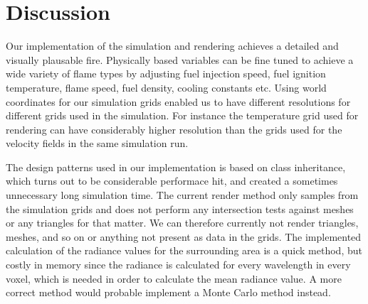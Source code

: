 \section{Discussion}
Our implementation of the simulation and rendering achieves a detailed and visually plausable fire. Physically based variables can be fine tuned to achieve a wide variety of flame types by adjusting fuel injection speed, fuel ignition temperature, flame speed, fuel density, cooling constants etc.  Using world coordinates for our simulation grids enabled us to have different resolutions for different grids used in the simulation. For instance the temperature grid used for rendering can have considerably higher resolution than the grids used for the velocity fields in the same simulation run.

The design patterns used in our implementation is based on class inheritance, which turns out to be considerable performace hit, and created a sometimes unnecessary long simulation time. The current render method only samples from the simulation grids and does not perform any intersection tests against meshes or any triangles for that matter. We can therefore currently not render triangles, meshes, and so on or anything not present as data in the grids. The implemented calculation of the radiance values for the surrounding area is a quick method, but costly in memory since the radiance is calculated for every wavelength in every voxel, which is needed in order to calculate the mean radiance value. A more correct method would probable implement a Monte Carlo method instead.